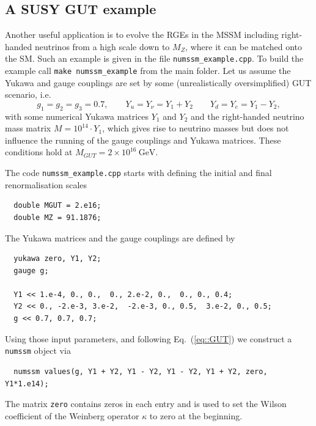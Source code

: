 \documentclass[11pt,a4paper]{article}
\begin{document}
\subsection{\label{sec::mssm_example} A SUSY GUT example}
Another useful application is to evolve the RGEs in the MSSM including right-handed neutrinos from a high scale down to $M_Z$, where it can be matched onto the SM. Such an example is given in the file \texttt{numssm\_example.cpp}.
To build the example call \texttt{make numssm\_example} from the main folder.
Let us assume the Yukawa and gauge couplings are set by some (unrealistically oversimplified) GUT scenario, i.e.
\begin{equation}
g_1 = g_2 = g_3 = 0.7, \qquad Y_u = Y_\nu = Y_1 + Y_2 \qquad Y_d = Y_e = Y_1 - Y_2, 
\label{eq::GUT}
\end{equation}
with some numerical Yukawa matrices $Y_1$ and $Y_2$ and the right-handed neutrino mass matrix $M = 10^{14}\cdot Y_1$, which gives rise to neutrino masses but
does not influence the running of the gauge couplings and Yukawa matrices. These conditions hold at $M_{GUT} = 2\times 10^{16}\ \mathrm{GeV}$.


The code \texttt{numssm\_example.cpp} starts with defining the initial and final renormalisation scales
\begin{lstlisting}
  double MGUT = 2.e16;
  double MZ = 91.1876;
\end{lstlisting}
The Yukawa matrices and the gauge couplings are defined by
\begin{lstlisting}
  yukawa zero, Y1, Y2;
  gauge g;

  Y1 << 1.e-4, 0., 0.,  0., 2.e-2, 0.,  0., 0., 0.4;
  Y2 << 0., -2.e-3, 3.e-2,  -2.e-3, 0., 0.5,  3.e-2, 0., 0.5;
  g << 0.7, 0.7, 0.7;
\end{lstlisting}
Using those input parameters, and following Eq.~(\ref{eq::GUT}) we construct a \texttt{numssm} object via
\begin{lstlisting}
  numssm values(g, Y1 + Y2, Y1 - Y2, Y1 - Y2, Y1 + Y2, zero, Y1*1.e14); 
\end{lstlisting}
The matrix \texttt{zero} contains zeros in each entry and is used to set the Wilson coefficient of the Weinberg operator $\kappa$ to zero at the beginning.
 
\end{document}
